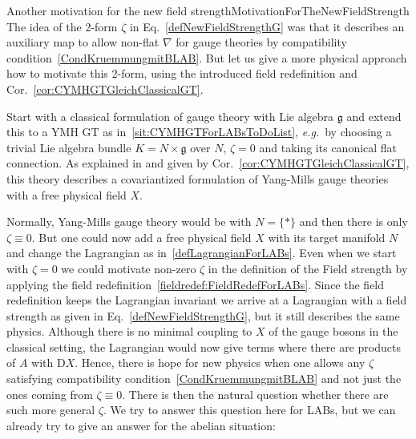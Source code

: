 \documentclass[preprint]{elsarticle}
\theoremstyle{plain}
\theoremstyle{remark}
\theoremstyle{definition}
\begin{document}
\begin{remarks}{Another motivation for the new field strength}{MotivationForTheNewFieldStrength}
The idea of the 2-form $\zeta$ in Eq.~\eqref{defNewFieldStrengthG} was that it describes an auxiliary map to allow non-flat $\nabla$ for gauge theories by compatibility condition~\eqref{CondKruemmungmitBLAB}. But let us give a more physical approach how to motivate this 2-form, using the introduced field redefinition and Cor.~\ref{cor:CYMHGTGleichClassicalGT}.

Start with a classical formulation of gauge theory with Lie algebra $\mathfrak{g}$ and extend this to a YMH GT as in~\ref{sit:CYMHGTForLABsToDoList}, \textit{e.g.}~by choosing a trivial Lie algebra bundle $K = N \times \mathfrak{g}$ over $N$, $\zeta = 0$ and taking its canonical flat connection. As explained in \cite{CurvedYMH} and given by Cor.~\ref{cor:CYMHGTGleichClassicalGT}, this theory describes a covariantized formulation of Yang-Mills gauge theories with a free physical field $X$.

Normally, Yang-Mills gauge theory would be with $N = \{*\}$ and then there is only $\zeta \equiv 0$. But one could now add a free physical field $X$ with its target manifold $N$ and change the Lagrangian as in~\eqref{defLagrangianForLABs}. Even when we start with $\zeta = 0$ we could motivate non-zero $\zeta$ in the definition of the Field strength by applying the field redefinition~\ref{fieldredef:FieldRedefForLABs}. Since the field redefinition keeps the Lagrangian invariant we arrive at a Lagrangian with a field strength as given in Eq.~\eqref{defNewFieldStrengthG}, but it still describes the same physics. Although there is no minimal coupling to $X$ of the gauge bosons in the classical setting, the Lagrangian would now give terms where there are products of $A$ with $\mathrm{D}X$. Hence, there is hope for new physics when one allows any $\zeta$ satisfying compatibility condition~\eqref{CondKruemmungmitBLAB} and not just the ones coming from $\zeta \equiv 0$. There is then the natural question whether there are such more general $\zeta$. We try to answer this question here for LABs, but we can already try to give an answer for the abelian situation:


\end{remarks}
\end{document}
